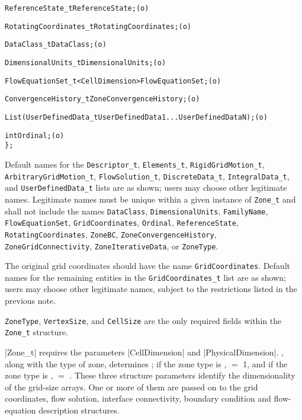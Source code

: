 \begin{alltt}
    ReferenceState_t ReferenceState ;                                       (o)

    RotatingCoordinates\_t RotatingCoordinates ;                             (o)

    DataClass_t DataClass ;                                                 (o)

    DimensionalUnits_t DimensionalUnits ;                                   (o)

    FlowEquationSet_t<CellDimension> FlowEquationSet ;                      (o)

    ConvergenceHistory_t ZoneConvergenceHistory ;                           (o)

    List( UserDefinedData\_t UserDefinedData1 ... UserDefinedDataN ) ;       (o)

    int Ordinal ;                                                           (o)
    \} ;
\end{alltt}

\begin{notes}
\item
 Default names for the \texttt{Descriptor\_t},
 \texttt{Elements\_t}, \texttt{RigidGridMotion\_t}, \texttt{ArbitraryGridMotion\_t},
 \texttt{FlowSolution\_t}, \texttt{DiscreteData\_t}, \texttt{IntegralData\_t}, and
 \texttt{UserDefinedData\_t}
 lists are as shown; users may choose other legitimate names.
 Legitimate names must be unique within a given instance of \texttt{Zone\_t}
 and shall not include the names
 \texttt{DataClass}, \texttt{DimensionalUnits}, \texttt{FamilyName},
 \texttt{FlowEquationSet}, \texttt{GridCoordinates}, \texttt{Ordinal},
 \texttt{Reference\-State}, \texttt{RotatingCoordinates}, \texttt{ZoneBC},
 \texttt{ZoneConvergenceHistory}, \texttt{ZoneGridConnectivity},
 \texttt{ZoneIterativeData}, or \texttt{ZoneType}.
\item
 The original grid coordinates should have the name \texttt{GridCoordinates}.
 Default names for the remaining entities in the \texttt{GridCoordinates\_t}
 list are as shown; users may choose other legitimate names, subject to
 the restrictions listed in the previous note.
\item
 \texttt{ZoneType}, \texttt{VertexSize}, and \texttt{CellSize}
 are the only required fields within the \texttt{Zone\_t} structure.
\end{notes}

|Zone_t| requires the parameters |CellDimension| and
|PhysicalDimension|.
, along with the type of zone, determines
; if the zone type is ,
 $=$ 1, and if the zone type is , 
 $=$ .
These three structure parameters identify the dimensionality of the
grid-size arrays.
One or more of them are passed on to the grid coordinates, flow
solution, interface connectivity, boundary condition and flow-equation
description structures.

